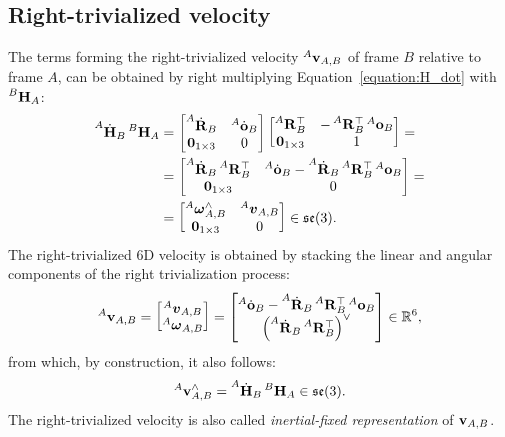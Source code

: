 \subsection{Right-trivialized velocity}
\label{sec:right_trivialized_velocity}

The terms forming the right-trivialized velocity $\velsix[A]_{A,B}$ of frame $B$ relative to frame $A$, can be obtained by right multiplying Equation~\eqref{equation:H_dot} with $\homo[B]_A$:
%
\begin{align*}
    \homod[A]_B \homo[B]_A
    &= \begin{bmatrix}
        \rotd[A]_B & \orid[A]_B \\ \zeros_{1\times 3} & 0
    \end{bmatrix}
    \begin{bmatrix}
        \rot[A]_B^\top & -\rot[A]_B^\top \ori[A]_B \\
        \zeros_{1\times3} & 1
    \end{bmatrix}
    =\\
    &= \begin{bmatrix}
        \rotd[A]_B \rot[A]_B^\top & \orid[A]_B - \rotd[A]_B \rot[A]_B^\top \ori[A]_B \\
        \zeros_{1\times 3} & 0
    \end{bmatrix} = \\
    &=
    \begin{bmatrix}
        \velang[A]_{A,B}^\wedge & \vellin[A]_{A,B} \\
        \zeros_{1\times 3} & 0
    \end{bmatrix}
    \in \se(3)
    .
\end{align*}
%
The right-trivialized 6D velocity is obtained by stacking the linear and angular components of the right trivialization process:
%
\begin{equation*}
    \velsix[A]_{A,B} =
    \begin{bmatrix}
        \vellin[A]_{A,B} \\ \velang[A]_{A,B}
    \end{bmatrix} =
    \begin{bmatrix}
        \orid[A]_B - \rotd[A]_B \rot[A]_B^\top \ori[A]_B \\
        \left( \rotd[A]_B \rot[A]_B^\top \right)^\vee
    \end{bmatrix}
    \in \realn^6
    ,
\end{equation*}
%
from which, by construction, it also follows:
%
\begin{equation*}
    \velsix[A]_{A,B}^\wedge = \homod[A]_B \homo[B]_A \in \se(3)
    .
\end{equation*}
%
The right-trivialized velocity is also called \emph{inertial-fixed representation} of $\velsix_{A,B}$.

